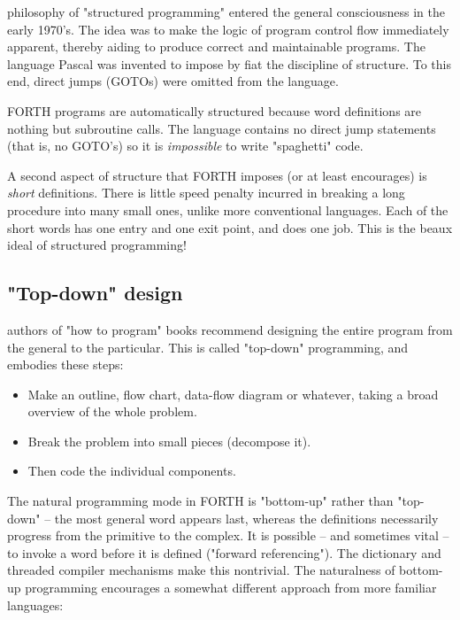  philosophy of "structured programming" entered the general consciousness in the early 1970’s. The idea was to make the logic of program control flow immediately apparent, thereby aiding to produce correct and maintainable programs. The language Pascal was invented to impose by fiat the discipline of structure. To this end, direct jumps (GOTOs) were omitted from the language.

FORTH programs are automatically structured because word definitions are nothing but subroutine calls. The language contains no direct jump statements (that is, no GOTO's) so it is \textit{impossible} to write "spaghetti" code.

A second aspect of structure that FORTH imposes (or at least encourages) is \textit{short} definitions. There is little speed penalty incurred in breaking a long procedure into many small ones, unlike more conventional languages. Each of the short words has one entry and one exit point, and does one job. This is the beaux ideal of structured programming!

\subsection{"Top-down" design}

 authors of "how to program" books recommend designing the entire program from the general to the particular. This is called "top-down" programming, and embodies these steps:

\begin{itemize}
    \item Make an outline, flow chart, data-flow diagram or whatever, taking a broad overview of the whole problem.
    \item Break the problem into small pieces (decompose it).
    \item Then code the individual components.
\end{itemize}

The natural programming mode in FORTH is "bottom-up" rather than "top-down" -- the most general word appears last, whereas the definitions necessarily progress from the primitive to the complex. It is possible -- and sometimes vital -- to invoke a word before it is defined ("forward referencing"). The dictionary and threaded compiler mechanisms make this nontrivial. The naturalness of bottom-up programming encourages a somewhat different approach from more familiar languages:

